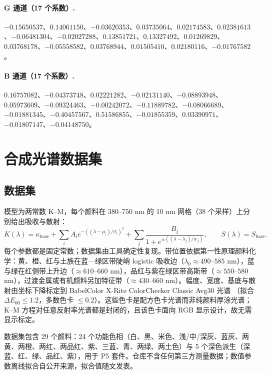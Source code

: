 \paragraph{G 通道（17 个系数）.}
$-0.15650537$、$0.14061150$、$-0.03620353$、$0.03735064$、$0.02174583$、$0.02381613$、$-0.06481304$、$-0.02027288$、$0.13851721$、$0.13327492$、$0.01269829$、$0.03768178$、$-0.05558582$、$0.03768944$、$0.01505410$、$0.02180116$、$-0.01767582$。

\paragraph{B 通道（17 个系数）.}
$0.16757082$、$-0.04373748$、$0.02221282$、$-0.02131140$、$-0.08893948$、$0.05973609$、$-0.09324463$、$-0.00242072$、$-0.11889782$、$-0.08066689$、$-0.01881345$、$-0.40457567$、$0.51586855$、$-0.01855359$、$0.03390971$、$-0.01807147$、$-0.04148750$。

\section{合成光谱数据集}
\label{app:synthetic}

\subsection{数据集}
模型为两常数 K--M，每个颜料在 380--750 nm 的 10 nm 网格（38 个采样）上分别给出吸收与散射：
\begin{equation}
K(\lambda)=\kappa_{\mathrm{base}}+\sum_{i}A_{i}e^{-((\lambda-\mu_{i})/\sigma_{i})^{2}}+\sum_{j}\frac{B_{j}}{1+e^{\pm((\lambda-\lambda_{j})/w_{j})}},
\qquad S(\lambda)=S_{\mathrm{base}}.
\end{equation}
每个参数都是固定常数；数据集由工具确定性复现。带位置依据第一性原理颜料化学：黄、橙、红与土族在蓝—绿区带陡峭 logistic 吸收边（$\lambda_{0}\approx490$--$585$ nm），蓝与绿在红侧带上升边（$\approx610$--$660$ nm），品红与紫在绿区带高斯带（$\approx550$--$580$ nm），过渡金属或有机颜料另加特征带（$\approx430$--$660$ nm）。幅度、宽度、基底与散射由坐标下降标定到 BabelColor X-Rite ColorChecker Classic Avg30 光谱 \cite{pascale2012}（拟合 $\Delta E_{00}\le1.2$，多数色卡 $\le0.2$）。这些色卡是配方色卡光谱而非纯颜料厚涂光谱；K--M 方程对任意反射率光谱都是封闭的，且该色卡面向 RGB 显示设计，故无需显示标定。

数据集包含 29 个颜料：24 个功能色相（白、黑、米色、浅/中/深灰、蓝灰、两黄、两橙、两红、两品红、紫、三蓝、青、两绿、两土色）与 5 个深色派生（深蓝、红、绿、品红、紫），用于 P5 套件。仓库不含任何第三方测量数据；数值参数离线拟合自公开来源，拟合值随文发表。

